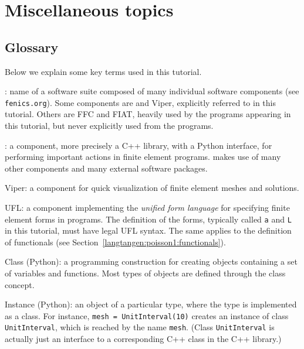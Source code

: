 \section{Miscellaneous topics}

\subsection{Glossary}


Below we explain some key terms used in this tutorial.\gln

\fenics: name of a software suite composed of many individual software
components (see {\fontsize{10pt}{10pt}\texttt{fenics.org}}). Some components are \dolfin{} and
Viper, explicitly referred to in this tutorial. Others are
FFC and FIAT, heavily used by the programs appearing in this tutorial,
but never explicitly used from the programs.\gln

\dolfin: a \fenics{} component, more precisely a C++ library, with
a Python interface, for performing important actions in finite element
programs. \dolfin{} makes use of many other \fenics{} components and
many external software packages.\gln

Viper: a \fenics{} component for quick visualization of finite element
meshes and solutions.\gln

UFL: a \fenics{} component implementing the \emph{unified form language} 
for specifying finite element forms in \fenics{} programs.
The definition of the forms, typically called {\fontsize{10pt}{10pt}\texttt{a}} and {\fontsize{10pt}{10pt}\texttt{L}} in
this tutorial, must have legal UFL syntax. The same applies to
the definition of functionals (see Section~\ref{langtangen:poisson1:functionals}).
\gln

Class (Python): a programming construction for creating objects 
containing a set of
variables and functions. Most
types of \fenics{} objects are defined through the class concept.\gln

Instance (Python): an object of a particular type, where the type is
implemented as a class. For instance,
{\fontsize{10pt}{10pt}\texttt{mesh = UnitInterval(10)}} creates
an instance of class {\fontsize{10pt}{10pt}\texttt{UnitInterval}}, which is reached by the 
name {\fontsize{10pt}{10pt}\texttt{mesh}}. (Class {\fontsize{10pt}{10pt}\texttt{UnitInterval}} is actually just 
an interface to a corresponding C++ class in the \dolfin{} C++ library.)\gln

